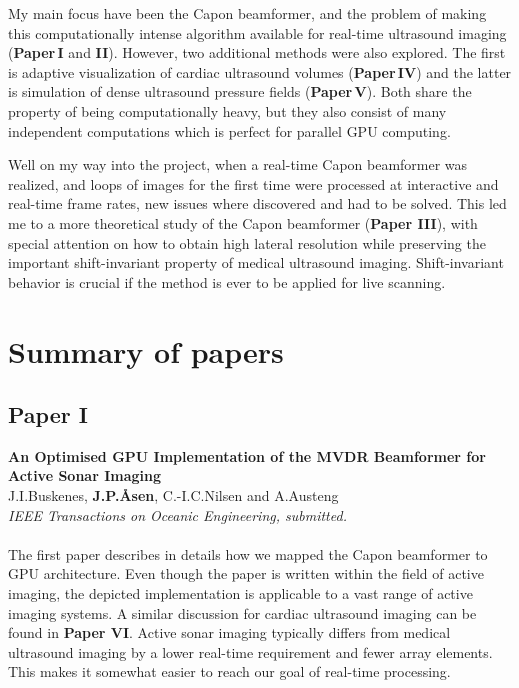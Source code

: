 My main focus have been the Capon beamformer, and the problem of making this computationally intense algorithm available for real-time ultrasound imaging (\textbf{Paper\,I} and \textbf{II}). However, two additional methods were also explored. The first is adaptive visualization of cardiac ultrasound volumes (\textbf{Paper\,IV}) and the latter is simulation of dense ultrasound pressure fields (\textbf{Paper\,V}). Both share the property of being computationally heavy, but they also consist of many independent computations which is perfect for parallel GPU computing. 

Well on my way into the project, when a real-time Capon beamformer was realized, and loops of images for the first time were processed at interactive and real-time frame rates, new issues where discovered and had to be solved. This led me to a more theoretical study of the Capon beamformer (\textbf{Paper III}), with special attention on how to obtain high lateral resolution while preserving the important shift-invariant property of medical ultrasound imaging. Shift-invariant behavior is crucial if the method is ever to be applied for live scanning. 



\section{Summary of papers}

\subsection{Paper I}
\textbf{An Optimised GPU Implementation of the MVDR Beamformer for Active Sonar Imaging}\\
J.\:I.\:Buskenes, \textbf{J.\:P.\:\AA{}sen}, C.-I.\:C.\:Nilsen and A.\:Austeng\\
{\it IEEE Transactions on Oceanic Engineering, submitted.}\\\\
The first paper describes in details how we mapped the Capon beamformer to GPU architecture. Even though the paper is written within the field of active  imaging, the depicted implementation is applicable to a vast range of active imaging systems. A similar discussion for cardiac ultrasound imaging can be found in \textbf{Paper VI}.  Active sonar imaging typically differs from medical ultrasound imaging by a lower real-time requirement and fewer array elements. This makes it somewhat easier to reach our goal of real-time processing. 

